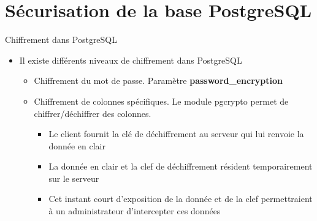 
\section{Sécurisation de la base PostgreSQL}


\begin{frame}[fragile]{Chiffrement dans PostgreSQL}

   \begin{itemize}
      \item Il existe différents niveaux de chiffrement dans PostgreSQL
      \begin{itemize}
         \item Chiffrement du mot de passe. Paramètre \textbf{password\_encryption}
         \item Chiffrement de colonnes spécifiques. Le module pgcrypto permet de chiffrer/déchiffrer des colonnes.
         \begin{itemize}
            \item Le client fournit la clé de déchiffrement au serveur qui lui renvoie la donnée en clair
            \item La donnée en clair et la clef de déchiffrement résident temporairement sur le serveur
            \item Cet instant court d'exposition de la donnée et de la clef permettraient à un administrateur d'intercepter ces données
         \end{itemize}
      \end{itemize}
   \end{itemize}

\begin{toile}
\end{toile}

\end{frame}


